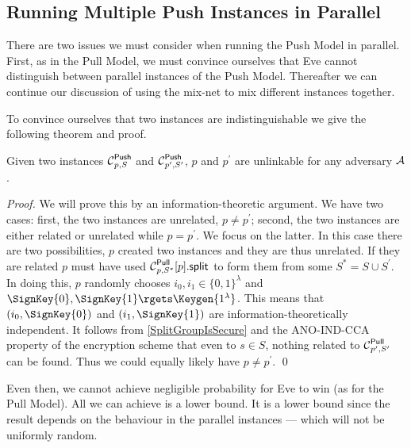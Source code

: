 \subsection{Running Multiple Push Instances in Parallel}
\label{ParallelPush}

There are two issues we must consider when running the Push Model in parallel.
First, as in the Pull Model, we must convince ourselves that Eve cannot 
distinguish between parallel instances of the Push Model.
Thereafter we can continue our discussion of using the mix-net to mix different
instances together.

To convince ourselves that two instances are indistinguishable we give the 
following theorem and proof.

\begin{theorem}
  Given two instances \(\Push[p, S]\) and \(\Push[p^\prime, S^\prime]\), \(p\) 
  and \(p^\prime\) are unlinkable for any adversary \(\A\).
\end{theorem}

\begin{proof}
  We will prove this by an information-theoretic argument.
  We have two cases: first, the two instances are unrelated, \(p\neq 
    p^\prime\); second, the two instances are either related or unrelated while 
  \(p = p^\prime\).
  We focus on the latter.
  In this case there are two possibilities, \(p\) created two instances and 
  they are thus unrelated.
  If they are related \(p\) must have used \(\psplit[p, S^*]{p}\) to form them 
  from some \(S^* = S\cup S^\prime\).
  In doing this, \(p\) randomly chooses \(i_0, i_1\in \{0, 1\}^\lambda\) and 
  \(\SignKey{0}, \SignKey{1}\rgets \Keygen{1^\lambda}\).
  This means that \((i_0, \SignKey{0})\) and \((i_1, \SignKey{1})\) are 
  information-theoretically independent.
  It follows from \cref{SplitGroupIsSecure} and the ANO-IND-CCA property of the 
  encryption scheme that even to \(s\in S\), nothing related to 
  \(\Pull[p^\prime, S^\prime]\) can be found.
  Thus we could equally likely have \(p\neq p^\prime\).
  \qed{}
\end{proof}

Even then, we cannot achieve negligible probability for Eve to win (as for the 
Pull Model).
All we can achieve is a lower bound.
It is a lower bound since the result depends on the behaviour in the parallel 
instances --- which will not be uniformly random.


